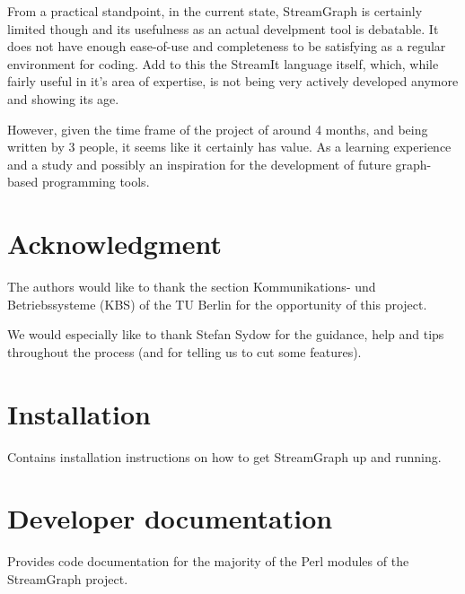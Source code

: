 \documentclass[journal]{IEEEtran}
\begin{document}
From a practical standpoint, in the current state, StreamGraph is certainly
limited though and its usefulness as an actual develpment tool is debatable.
It does not have enough ease-of-use and completeness to be satisfying as a
regular environment for coding. Add to this the StreamIt language itself,
which, while fairly useful in it's area of expertise, is not being very
actively developed anymore and showing its age.

However, given the time frame of the project of around 4 months, and being
written by 3 people, it seems like it certainly has value. As a learning
experience and a study and possibly an inspiration for the development of
future graph-based programming tools.



\section*{Acknowledgment}


\noindent The authors would like to thank the section Kommunikations- und
Betriebssysteme (KBS) of the TU Berlin for the opportunity of this project.

\noindent We would especially like to thank Stefan Sydow for the guidance, help and tips
throughout the process (and for telling us to cut some features).



\appendices

\section{Installation}
\noindent Contains installation instructions on how to get StreamGraph up and
running.

\section{Developer documentation}
\noindent Provides code documentation for the majority of the Perl modules of
the StreamGraph project.

\ifCLASSOPTIONcaptionsoff
  \newpage
\fi


\end{document}
